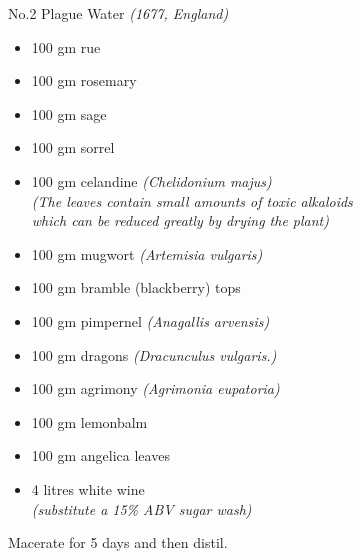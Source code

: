 \documentclass[11pt]{report}
\begin{document}
\begin{titlepage}
\begin{multicols}{3}
            {
                No.2 Plague Water \emph{(1677, England)}
                \vspace*{\baselineskip}
                \begin{itemize}
                    \renewcommand{\labelitemi}{$\circ$}
                    \item 100 gm rue
                    \item 100 gm rosemary
                    \item 100 gm sage
                    \item 100 gm sorrel
                    \item 100 gm celandine \emph{(Chelidonium majus)\\
                        [0.4\baselineskip]
                        (The leaves contain small amounts of toxic alkaloids\\
                        which can be reduced greatly by drying the plant)}
                    \item 100 gm mugwort \emph{(Artemisia vulgaris)}
                    \item 100 gm bramble (blackberry) tops
                    \item 100 gm pimpernel \emph{(Anagallis arvensis)}
                    \item 100 gm dragons \emph{(Dracunculus vulgaris.)}
                    \item 100 gm agrimony \emph{(Agrimonia eupatoria)}
                    \item 100 gm lemonbalm
                    \item 100 gm angelica leaves
                    \item 4 litres white wine\\
                        [0.4\baselineskip]
                        \emph{(substitute a 15\% ABV sugar wash)}
                \end{itemize}
                \vspace*{\baselineskip}
                Macerate for 5 days and then distil.
            }



        \end{multicols}
    \end{titlepage}
\end{document}
